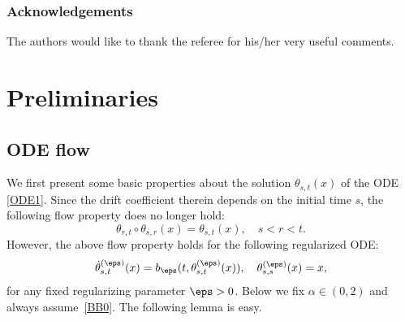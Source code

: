 \subsubsection*{Acknowledgements}
The authors would like to thank the referee for his/her very useful comments.

\section{Preliminaries}
\label{SEC_PRELIM}
\subsection{ODE flow}
We first present some basic properties about the solution $\theta_{s,t}(x)$ of the ODE \eqref{ODE1}. Since the drift coefficient therein
depends on the initial time $s$, the following flow property does no longer hold:
\[
\theta_{r,t}\circ \theta_{s,r}(x)=\theta_{s,t}(x),\quad s<r<t.
\]
However, the above flow property holds for the following regularized ODE:
\begin{align}\label{ODE0}
\dot\theta^{(\eps)}_{s,t}(x)=b_\eps(t,\theta^{(\eps)}_{s,t}(x)),\quad \theta^{(\eps)}_{s,s}(x)=x,
\end{align}
for any fixed regularizing parameter $\eps>0 $.
Below we fix $\alpha\in(0,2)$ and always assume~\eqref{BB0}.
The following lemma is easy.

